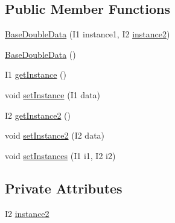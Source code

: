 \subsection*{Public Member Functions}
\begin{DoxyCompactItemize}
\item 
\hyperlink{classit_1_1emarolab_1_1cagg_1_1core_1_1language_1_1BaseDoubleData_3_01I1_00_01I2_01_4_a14acda5202f3d80bed3c0feed4de0e00}{Base\-Double\-Data} (I1 instance1, I2 \hyperlink{classit_1_1emarolab_1_1cagg_1_1core_1_1language_1_1BaseDoubleData_3_01I1_00_01I2_01_4_abc041cee0a1cc9732753a909ff33bcf8}{instance2})
\item 
\hyperlink{classit_1_1emarolab_1_1cagg_1_1core_1_1language_1_1BaseDoubleData_3_01I1_00_01I2_01_4_a7fdfd2357d15cb900b63b755ab08b290}{Base\-Double\-Data} ()
\item 
I1 \hyperlink{classit_1_1emarolab_1_1cagg_1_1core_1_1language_1_1BaseDoubleData_3_01I1_00_01I2_01_4_a6afc0da242e3b63565b5c4450fa7a5b7}{get\-Instance} ()
\item 
void \hyperlink{classit_1_1emarolab_1_1cagg_1_1core_1_1language_1_1BaseDoubleData_3_01I1_00_01I2_01_4_a72415e787450910fe81591f115d82411}{set\-Instance} (I1 data)
\item 
I2 \hyperlink{classit_1_1emarolab_1_1cagg_1_1core_1_1language_1_1BaseDoubleData_3_01I1_00_01I2_01_4_ad71c577180a9ea0c0246f84219b17fbe}{get\-Instance2} ()
\item 
void \hyperlink{classit_1_1emarolab_1_1cagg_1_1core_1_1language_1_1BaseDoubleData_3_01I1_00_01I2_01_4_ab7c4ec3ff970da0bcca788a4845c7246}{set\-Instance2} (I2 data)
\item 
void \hyperlink{classit_1_1emarolab_1_1cagg_1_1core_1_1language_1_1BaseDoubleData_3_01I1_00_01I2_01_4_a2860637ce0a58e0ed2ce599216749d43}{set\-Instances} (I1 i1, I2 i2)
\end{DoxyCompactItemize}
\subsection*{Private Attributes}
\begin{DoxyCompactItemize}
\item 
I2 \hyperlink{classit_1_1emarolab_1_1cagg_1_1core_1_1language_1_1BaseDoubleData_3_01I1_00_01I2_01_4_abc041cee0a1cc9732753a909ff33bcf8}{instance2}
\end{DoxyCompactItemize}


